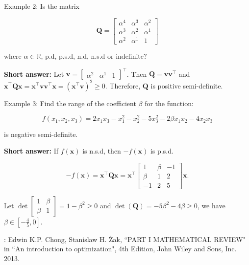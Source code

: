 \bigskip
\noindent
Example 2: Is the matrix

\begin{equation*}
	\boldsymbol{Q}=\left[\begin{array}{ccc}
		\alpha^{4} & \alpha^{3} & \alpha^{2} \\
		\alpha^{3} & \alpha^{2} & \alpha^{1} \\
		\alpha^{2} & \alpha^{1} & 1
	\end{array}\right]
\end{equation*}

where \(\alpha \in \mathbb{R}\), p.d, p.s.d, n.d, n.s.d or indefinite?

\noindent
\textbf{Short answer:}
Let \(\boldsymbol{v}=\left[\begin{array}{lll}\alpha^{2} & \alpha^{1} & 1\end{array}\right]^{\top}\). Then \(\boldsymbol{Q}=\boldsymbol{v} \boldsymbol{v}^{\top}\) and \(\boldsymbol{x}^{\top} \boldsymbol{Q} \boldsymbol{x}=\boldsymbol{x}^{\top} \boldsymbol{v} \boldsymbol{v}^{\top} \boldsymbol{x}=\left(\boldsymbol{x}^{\top} \boldsymbol{v}\right)^{2} \geq 0\). Therefore, \(\boldsymbol{Q}\) is positive semi-definite.


\bigskip
\noindent
Example 3: Find the range of the coefficient \(\beta\) for the function:

\begin{equation*}
	f\left(x_{1}, x_{2}, x_{3}\right)=2 x_{1} x_{3}-x_{1}^{2}-x_{2}^{2}-5 x_{3}^{2}-2 \beta x_{1} x_{2}-4 x_{2} x_{3}
\end{equation*}

is negative semi-definite.

\noindent
\textbf{Short answer:}
If \(f(\boldsymbol{x})\) is n.s.d, then \(-f(\boldsymbol{x})\) is p.s.d.

\begin{equation*}
	-f(\boldsymbol{x})=\boldsymbol{x}^{\top} \boldsymbol{Q} \boldsymbol{x}=\boldsymbol{x}^{\top}\left[\begin{array}{ccc}
		1 & \beta & -1 \\
		\beta & 1 & 2 \\
		-1 & 2 & 5
	\end{array}\right] \boldsymbol{x} .
\end{equation*}

Let \(\operatorname{det}\left[\begin{array}{ll}1 & \beta \\ \beta & 1\end{array}\right]=1-\beta^{2} \geq 0\) and \(\operatorname{det}(\boldsymbol{Q})=-5 \beta^{2}-4 \beta \geq 0\), we have \(\beta \in\left[-\frac{4}{5}, 0\right]\).

\bigskip

\noindent
[Ref]: Edwin K.P. Chong, Stanislaw H. Żak, ``PART I MATHEMATICAL REVIEW" in ``An introduction to optimization", 4th Edition, John Wiley and Sons, Inc. 2013.
